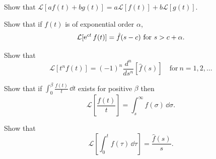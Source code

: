 {%
\begin{Exercise} 
  \label{exercise L(a f + b g) = a L(f) + b L(g)}
  Show that $\mathcal{L}[a f(t) + b g(t)] = a\mathcal{L}[f(t)] 
  + b\mathcal{L}[g(t)]$.

\end{Exercise}


\begin{Exercise} %
  \label{exercise L(e c t f) = F(s-c)}
  Show that if $f(t)$ is of exponential order $\alpha$,
  \[ 
  \mathcal{L}[\e^{c t} f(t)] = \hat{f}(s-c)\ \mathrm{for}\ s > c + \alpha.
  \]

\end{Exercise}


\begin{Exercise} 
  \label{exercise L(t n f) = }
  Show that
  \[ 
  \mathcal{L}[t^n f(t)] = (-1)^n \frac{d^n}{d s^n}[\hat{f}(s)] 
  \quad \mathrm{for}\ n = 1, 2, \ldots 
  \]

\end{Exercise}



\begin{Exercise}
  \label{exercise L(f(t)/t)}
  Show that if $\int_0^\beta \frac{f(t)}{t}\,\dd t$ exists for positive $\beta$ then
  \[ 
  \mathcal{L}\left[ \frac{f(t)}{t} \right] 
  = \int_s^\infty \hat{f}(\sigma)\,\dd \sigma.
  \]

\end{Exercise}






\begin{Exercise}
  \label{exercise L(int f(t))}
  Show that
  \[ 
  \mathcal{L}\left[ \int_0^t f(\tau)\,\dd \tau\right] = \frac{\hat{f}(s)}{s}. 
  \]

\end{Exercise}








}
